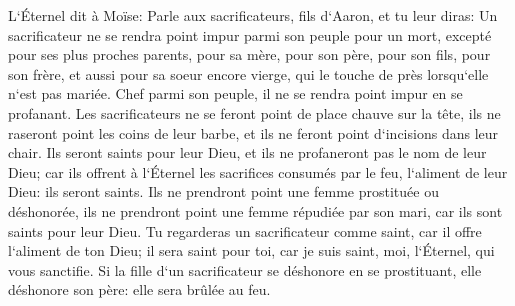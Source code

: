 \verse L`Éternel dit à Moïse: Parle aux sacrificateurs, fils d`Aaron, et tu leur diras: Un sacrificateur ne se rendra point impur parmi son peuple pour un mort, 
\verse excepté pour ses plus proches parents, pour sa mère, pour son père, pour son fils, pour son frère, 
\verse et aussi pour sa soeur encore vierge, qui le touche de près lorsqu`elle n`est pas mariée. 
\verse Chef parmi son peuple, il ne se rendra point impur en se profanant. 
\verse Les sacrificateurs ne se feront point de place chauve sur la tête, ils ne raseront point les coins de leur barbe, et ils ne feront point d`incisions dans leur chair. 
\verse Ils seront saints pour leur Dieu, et ils ne profaneront pas le nom de leur Dieu; car ils offrent à l`Éternel les sacrifices consumés par le feu, l`aliment de leur Dieu: ils seront saints. 
\verse Ils ne prendront point une femme prostituée ou déshonorée, ils ne prendront point une femme répudiée par son mari, car ils sont saints pour leur Dieu. 
\verse Tu regarderas un sacrificateur comme saint, car il offre l`aliment de ton Dieu; il sera saint pour toi, car je suis saint, moi, l`Éternel, qui vous sanctifie. 
\verse Si la fille d`un sacrificateur se déshonore en se prostituant, elle déshonore son père: elle sera brûlée au feu. 
